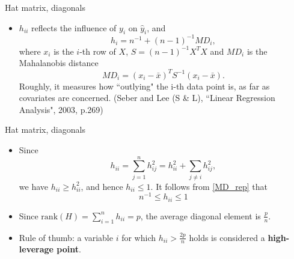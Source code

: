 \documentclass{beamer}
\newenvironment{wideitemize}%
  {\begin{itemize}%
    \setlength{\parskip}{1em}}%
  {\end{itemize}}
\begin{document}
\begin{frame}{Hat matrix, diagonals}
\begin{itemize}
\item
$h_{ii}$ reflects the influence of $y_i$ on $\hat{y}_i$, and
\begin{equation} \label{MD_rep}
h_i = n^{-1}+ (n-1)^{-1} MD_i,
\end{equation}
where $x_i$ is the $i$-th row of $X$, $S = (n-1)^{-1}X^TX$ and $MD_i$ is the Mahalanobis distance
\[
MD_i = (x_i - \bar{x})^TS^{-1}(x_i - \bar{x}).
\] 
Roughly, it measures how ``outlying" the i-th data point is, as far as covariates are concerned.  (Seber and Lee (S \& L), ``Linear Regression Analysis",  2003, p.269)




\end{itemize}

\end{frame}

\begin{frame}{Hat matrix, diagonals}

\begin{wideitemize}

\item Since
\[
h_{ii} = \sum_{j=1}^n h_{ij}^2 = h_{ii}^2  + \sum_{j \neq  i } h_{ij}^2,
\]
we have $h_{ii} \geq h_{ii}^2$, and hence $h_{ii}\leq 1$. It follows from \eqref{MD_rep} that
\[
n^{-1} \leq  h_{ii}\leq 1
\]
\item
Since $\displaystyle \mbox{rank}(H)=\sum_{i=1}^n h_{ii}=p$,  the average diagonal element is 
$\frac{p}{n}$.

\item
Rule of thumb: a variable $i$ for which $h_{ii}>\frac{2p}{n}$ holds is considered a \textbf{high-leverage
point}. 


\end{wideitemize}

\end{frame}
\end{document}
